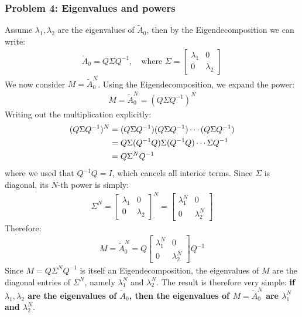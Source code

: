 \documentclass[12pt,twoside]{article}
\begin{document}
\subsubsection*{{\color{red}Problem 4: Eigenvalues and powers}}

Assume $\lambda_1, \lambda_2$ are the eigenvalues of $\tilde{A}_0$, then by the
Eigendecomposition we can write:
\begin{align}
    \tilde{A}_0 = Q\Sigma Q^{-1}, \quad \text{where } \Sigma = \begin{bmatrix} \lambda_1 & 0 \\ 0 & \lambda_2 \end{bmatrix}
\end{align}
We now consider $M = \tilde{A}_0^N$. Using the Eigendecomposition, we expand the power:
\begin{align}
    M = \tilde{A}_0^N = (Q\Sigma Q^{-1})^N
\end{align}
Writing out the multiplication explicitly:
\begin{align}
    (Q\Sigma Q^{-1})^N &= (Q\Sigma Q^{-1})(Q\Sigma Q^{-1})\cdots(Q\Sigma Q^{-1}) \notag \\
    &= Q\Sigma (Q^{-1}Q)\Sigma (Q^{-1}Q)\cdots\Sigma Q^{-1} \notag \\
    &= Q\Sigma^N Q^{-1}
\end{align}
where we used that $Q^{-1}Q = I$, which cancels all interior terms. Since $\Sigma$ is
diagonal, its $N$-th power is simply:
\begin{align}
    \Sigma^N = \begin{bmatrix} \lambda_1 & 0 \\ 0 & \lambda_2 \end{bmatrix}^N = \begin{bmatrix} \lambda_1^N & 0 \\ 0 & \lambda_2^N \end{bmatrix}
\end{align}
Therefore:
\begin{align}
    M = \tilde{A}_0^N = Q \begin{bmatrix} \lambda_1^N & 0 \\ 0 & \lambda_2^N \end{bmatrix} Q^{-1}
\end{align}
Since $M = Q\Sigma^N Q^{-1}$ is itself an Eigendecomposition, the eigenvalues of $M$
are the diagonal entries of $\Sigma^N$, namely $\lambda_1^N$ and $\lambda_2^N$.
The result is therefore very simple: \textbf{if $\lambda_1, \lambda_2$ are the
eigenvalues of $\tilde{A}_0$, then the eigenvalues of $M = \tilde{A}_0^N$ are
$\lambda_1^N$ and $\lambda_2^N$}.
	
\end{document}
